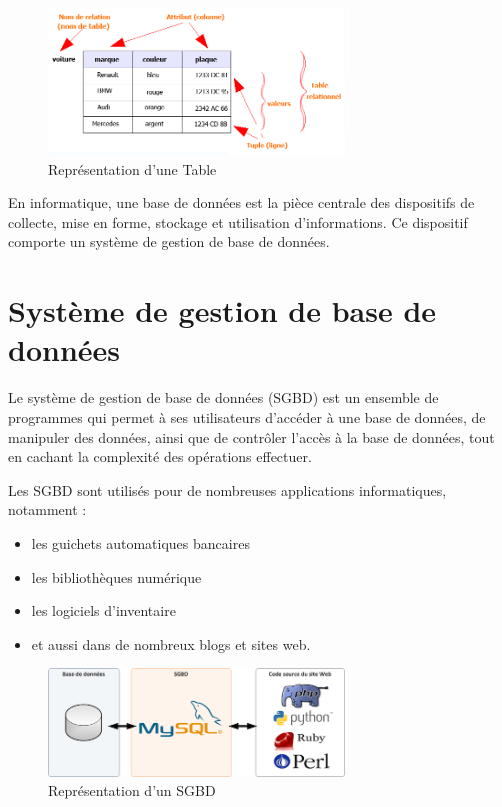 \documentclass[oneside,13pt,a4paper]{report}
\begin{document}
\begin{figure}[h]
	\centering
	\includegraphics[width=0.7\textwidth]{img/table_relationnel.png}
	\caption{Représentation d'une Table}
\end{figure}

En informatique, une base de données est la pièce centrale des dispositifs de collecte, mise en forme, stockage et utilisation d'informations.
Ce dispositif comporte un système de gestion de base de données.

\section{Système de gestion de base de données}
\label{sgbd}
Le système de gestion de base de données (SGBD) est un ensemble de programmes qui permet à ses utilisateurs d'accéder à une base de données,
de manipuler des données, ainsi que de contrôler l'accès à la base de données, tout en cachant la complexité des opérations effectuer.

Les SGBD sont utilisés pour de nombreuses applications informatiques, notamment :
\begin{itemize}
	\item les guichets automatiques bancaires
	\item les bibliothèques numérique
	\item les logiciels d'inventaire
	\item et aussi dans de nombreux blogs et sites web.
\end{itemize}


\begin{figure}[h]
	\centering
	\includegraphics[width=0.7\textwidth]{img/sgbd.png}
	\caption{Représentation d'un SGBD}
\end{figure}
\end{document}
